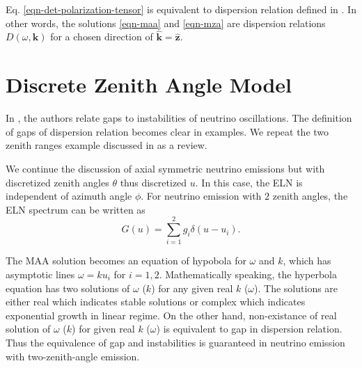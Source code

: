 \documentclass[%
preprint,
 amsmath,amssymb,
 aps,
 prd
]{revtex4-1}
\begin{document}
Eq. \eqref{eqn-det-polarization-tensor} is equivalent to dispersion relation defined in . In other words, the solutions \eqref{eqn-maa} and \eqref{eqn-mza} are dispersion relations $D(\omega,\mathbf k)$ for a chosen direction of $\hat{\mathbf k} = \hat{\mathbf z}$.




{\color{red}{\bf HAVE TO EXPLAIN THE IDEA OF GAP AND INSTABILITY HERE. Maybe Later?}}






\section{\label{sec-DiscreteAgnles}Discrete Zenith Angle Model}

In , the authors relate gaps to instabilities of neutrino oscillations. The definition of gaps of dispersion relation becomes clear in examples. We repeat the two zenith ranges example discussed in  as a review.

We continue the discussion of axial symmetric neutrino emissions but with discretized zenith angles $\theta$ thus discretized $u$. In this case, the ELN is independent of azimuth angle $\phi$. For neutrino emission with $2$ zenith angles, the ELN spectrum can be written as
\begin{equation}
G(u)= \sum_{i=1}^2 g_i \delta(u - u_i).
\end{equation}

The MAA solution becomes an equation of hypobola for $\omega$ and $k$, which has asymptotic lines $\omega = k u_i$ for $i=1,2$. Mathematically speaking, the hyperbola equation has two solutions of $\omega$ ($k$) for any given real $k$ ($\omega$). The solutions are either real which indicates stable solutions or complex which indicates exponential growth in linear regime. On the other hand, non-existance of real solution of $\omega$ ($k$) for given real $k$ ($\omega$) is equivalent to gap in dispersion relation. Thus the equivalence of gap and instabilities is guaranteed in neutrino emission with two-zenith-angle emission.
\end{document}
